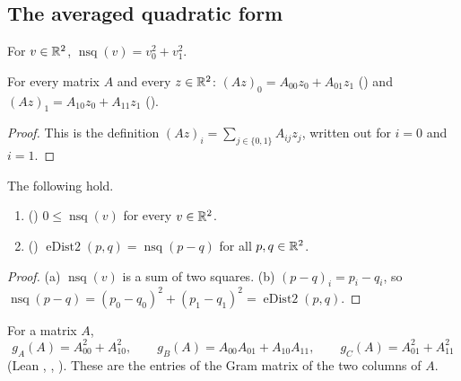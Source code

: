 \subsection{The averaged quadratic form}

\begin{definition}\label{ar:def:nsq}
For $v\in\mathbb R^2$, $\operatorname{nsq}(v)=v_0^2+v_1^2$.
\end{definition}

\begin{lemma}\label{ar:lem:mulvec}
For every matrix $A$ and every $z\in\mathbb R^2$: $(Az)_0=A_{00}z_0+A_{01}z_1$ \textup{(}\textup{)} and
$(Az)_1=A_{10}z_0+A_{11}z_1$ \textup{(}\textup{)}.
\end{lemma}

\begin{proof}
This is the definition $(Az)_i=\sum_{j\in\{0,1\}}A_{ij}z_j$, written out for $i=0$ and $i=1$.
\end{proof}

\begin{lemma}\label{ar:lem:nsq}
The following hold.
\begin{enumerate}[label=\textup{(\alph*)}]
\item \textup{(}\textup{)} $0\le\operatorname{nsq}(v)$ for every $v\in\mathbb R^2$.
\item \textup{(}\textup{)} $\operatorname{eDist2}(p,q)=\operatorname{nsq}(p-q)$ for all
$p,q\in\mathbb R^2$.
\end{enumerate}
\end{lemma}

\begin{proof}
(a) $\operatorname{nsq}(v)$ is a sum of two squares. (b) $(p-q)_i=p_i-q_i$, so
$\operatorname{nsq}(p-q)=(p_0-q_0)^2+(p_1-q_1)^2=\operatorname{eDist2}(p,q)$.
\end{proof}

\begin{definition}\label{ar:def:gram}
For a matrix $A$,
\[
g_A(A)=A_{00}^2+A_{10}^2,\qquad g_B(A)=A_{00}A_{01}+A_{10}A_{11},\qquad g_C(A)=A_{01}^2+A_{11}^2
\]
(Lean , , ). These are the entries of the Gram matrix of the two columns of $A$.
\end{definition}

